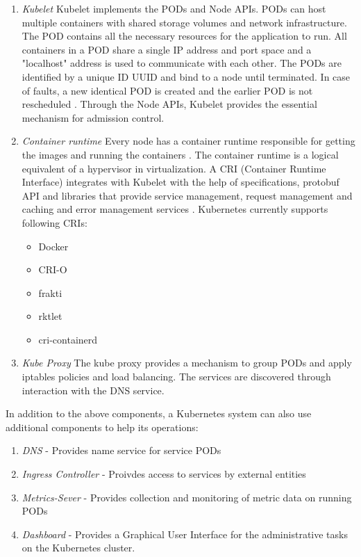 \begin{enumerate}
    \item \textit{Kubelet}
        Kubelet implements the PODs and Node APIs. PODs can host multiple containers with shared storage volumes and network infrastructure. The POD contains all the necessary resources for the application to run. All containers in a POD share a single IP address and port space and a "localhost" address is used to communicate with each other. The PODs are identified by a unique ID UUID and bind to a node until terminated. In case of faults, a new identical POD is created and the earlier POD is not rescheduled \cite{k8spod}. Through the Node APIs, Kubelet provides the essential mechanism for admission control. 
    \item \textit{Container runtime}
        Every node has a container runtime responsible for getting the images and running the containers \cite{k8sarch}. The container runtime is a logical equivalent of a hypervisor in virtualization. A CRI (Container Runtime Interface) integrates with Kubelet with the help of specifications, protobuf API and libraries that provide service management, request management and caching and error management services \cite{k8scri}. Kubernetes currently supports following CRIs:
        \begin{itemize}
            \item Docker
            \item CRI-O
            \item frakti
            \item rktlet
            \item cri-containerd
        \end{itemize}
    \item \textit{Kube Proxy}
        The kube proxy provides a mechanism to group PODs and apply iptables policies and load balancing. The services are discovered through interaction with the DNS service.
\end{enumerate}

In addition to the above components, a Kubernetes system can also use additional components to help its operations:
\begin{enumerate}
    \item \textit{DNS} - Provides name service for service PODs
    \item \textit{Ingress Controller} - Proivdes access to services by external entities
    \item \textit{Metrics-Sever} - Provides collection and monitoring of metric data on running PODs
    \item \textit{Dashboard} - Provides a Graphical User Interface for the administrative tasks on the Kubernetes cluster.
\end{enumerate}

